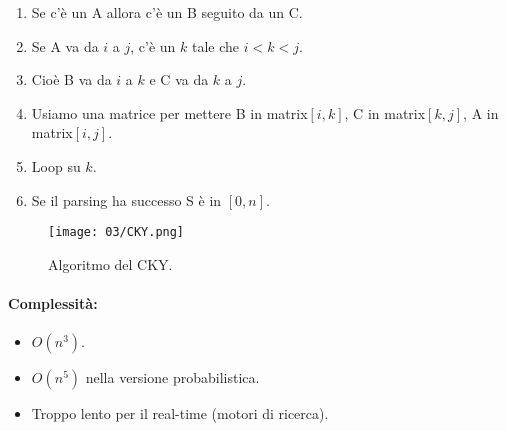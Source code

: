 \begin{enumerate}
  \item Se c'è un A allora c'è un B seguito da un C. 
  \item Se A va da $i$ a $j$, c'è un $k$ tale che $i < k < j$. 
  \item Cioè B va da $i$ a $k$ e C va da $k$ a $j$. 
  \item Usiamo una matrice per mettere B in matrix$[i,k]$, C in matrix$[k,j]$, A in matrix$[i,j]$. 
  \item Loop su $k$. 
  \item Se il parsing ha successo S è in $[0, n]$.
\end{enumerate}

\begin{figure}[!h]
    \centering
    \texttt{[image: 03/CKY.png]}
    \caption{Algoritmo del CKY.}
\end{figure}

\paragraph{Complessità:}

\begin{itemize}
  \item $O(n^3)$. 
  \item $O(n^5)$ nella versione probabilistica. 
  \item Troppo lento per il real-time (motori di ricerca). 
\end{itemize}







